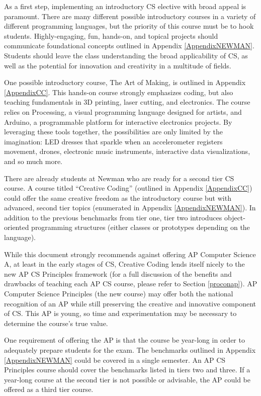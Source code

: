 As a first step, implementing an introductory CS elective with broad appeal is paramount. There are many different possible introductory courses in a variety of different programming languages, but the priority of this course must be to hook students. Highly-engaging, fun, hands-on, and topical projects should communicate foundational concepts outlined in Appendix \ref{AppendixNEWMAN}. Students should leave the class understanding the broad applicability of CS, as well as the potential for innovation and creativity in a multitude of fields. \par
One possible introductory course, The Art of Making, is outlined in Appendix \ref{AppendixCC}. This hands-on course strongly emphasizes coding, but also teaching fundamentals in 3D printing, laser cutting, and electronics. The course relies on Processing, a visual programming language designed for artists, and Arduino, a programmable platform for interactive electronics projects. By leveraging these tools together, the possibilities are only limited by the imagination: LED dresses that sparkle when an accelerometer registers movement, drones, electronic music instruments, interactive data visualizations, and so much more. \par

There are already students at Newman who are ready for a second tier CS course. A course titled ``Creative Coding'' (outlined in Appendix \ref{AppendixCC}) could offer the same creative freedom as the introductory course but with advanced, second tier topics (enumerated in Appendix \ref{AppendixNEWMAN}). In addition to the previous benchmarks from tier one, tier two introduces object-oriented programming structures (either classes or prototypes depending on the language). \par

While this document strongly recommends against offering AP Computer Science A, at least in the early stages of CS, Creative Coding lends itself nicely to the new AP CS Principles framework (for a full discussion of the benefits and drawbacks of teaching each AP CS course, please refer to Section \ref{proconap}). AP Computer Science Principles (the new course) may offer both the national recognition of an AP while still preserving the creative and innovative component of CS. This AP is young, so time and experimentation may be necessary to determine the course's true value.\par 
One requirement of offering the AP is that the course be year-long in order to adequately prepare students for the exam. The benchmarks outlined in Appendix \ref{AppendixNEWMAN} could be covered in a single semester. An AP CS Principles course should cover the benchmarks listed in tiers two and three. If a year-long course at the second tier is not possible or advisable, the AP could be offered as a third tier course.\par

